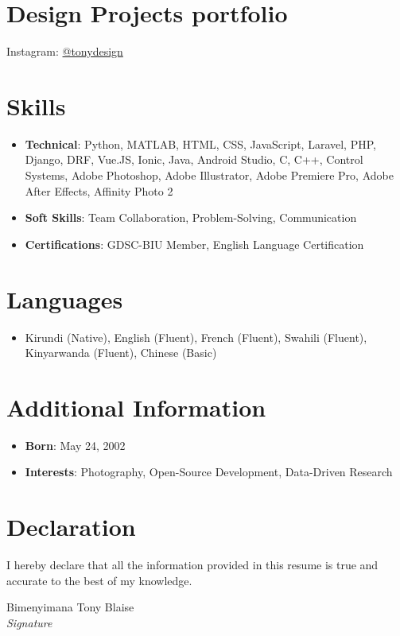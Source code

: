 \documentclass[10pt,letterpaper]{article}
\begin{document}
\section*{Design Projects portfolio}

Instagram: \href{https://www.instagram.com/tony_design257?igsh=czR1YW1rZ3lvbmE5}{@tonydesign} \\


\section*{Skills}
\begin{itemize}[leftmargin=*,nosep]
    \item \textbf{Technical}: Python, MATLAB, HTML, CSS, JavaScript, Laravel, PHP, Django, DRF, Vue.JS, Ionic, Java, Android Studio, C, C++, Control Systems, Adobe Photoshop, Adobe Illustrator, Adobe Premiere Pro, Adobe After Effects, Affinity Photo 2
    \item \textbf{Soft Skills}: Team Collaboration, Problem-Solving, Communication
    \item \textbf{Certifications}: GDSC-BIU Member, English Language Certification
\end{itemize}

\section*{Languages}
\begin{itemize}[leftmargin=*,nosep]
    \item Kirundi (Native), English (Fluent), French (Fluent), Swahili (Fluent), Kinyarwanda (Fluent), Chinese (Basic)
\end{itemize}

\section*{Additional Information}
\begin{itemize}[leftmargin=*,nosep]
    \item \textbf{Born}: May 24, 2002
    \item \textbf{Interests}: Photography, Open-Source Development, Data-Driven Research
\end{itemize}

\section*{Declaration}
I hereby declare that all the information provided in this resume is true and accurate to the best of my knowledge.

\vspace{0.5cm}
{\calligra \large Bimenyimana Tony Blaise} \\
\textit{Signature}
\end{document}
